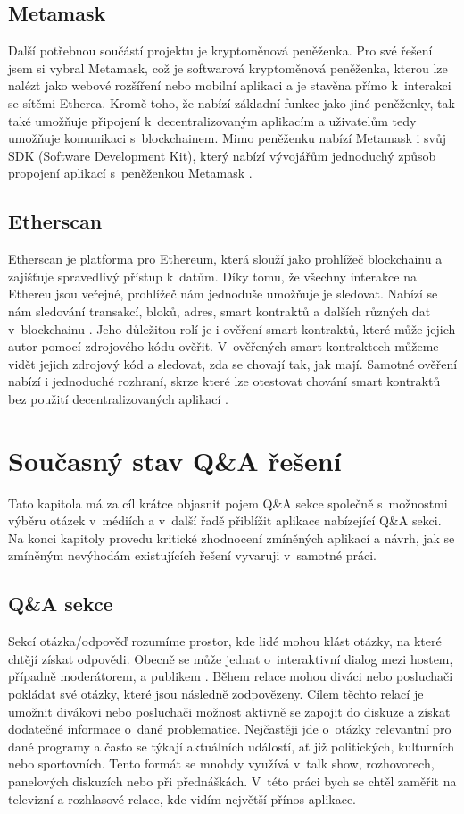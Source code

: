 \section{Metamask}
Další potřebnou součástí projektu je kryptoměnová peněženka. Pro své řešení jsem si vybral Metamask, což je softwarová kryptoměnová peněženka, kterou lze nalézt jako webové rozšíření nebo mobilní aplikaci a je stavěna přímo k~interakci se sítěmi Etherea. Kromě toho, že nabízí základní funkce jako jiné peněženky, tak také umožňuje připojení k~decentralizovaným aplikacím a uživatelům tedy umožňuje komunikaci s~blockchainem. Mimo peněženku nabízí Metamask i svůj SDK (Software Development Kit), který nabízí vývojářům jednoduchý způsob propojení aplikací s~peněženkou Metamask \cite{metamask}.

\section{Etherscan}
Etherscan je platforma pro Ethereum, která slouží jako prohlížeč blockchainu a zajišťuje spravedlivý přístup k~datům. Díky tomu, že všechny interakce na Ethereu jsou veřejné, prohlížeč nám jednoduše umožňuje je sledovat. Nabízí se nám sledování transakcí, bloků, adres, smart kontraktů a dalších různých dat v~blockchainu \cite{binance_etherscan}. Jeho důležitou rolí je i ověření smart kontraktů, které může jejich autor pomocí zdrojového kódu ověřit. V~ověřených smart kontraktech můžeme vidět jejich zdrojový kód a sledovat, zda se chovají tak, jak mají. Samotné ověření nabízí i jednoduché rozhraní, skrze které lze otestovat chování smart kontraktů bez použití decentralizovaných aplikací \cite{etherscan}.

\chapter{Současný stav Q\&A řešení}
\label{chapter:5}
Tato kapitola má za cíl krátce objasnit pojem Q\&A sekce společně s~možnostmi výběru otázek v~médiích a v~další řadě přiblížit aplikace nabízející Q\&A sekci. Na konci kapitoly provedu kritické zhodnocení zmíněných aplikací a návrh, jak se zmíněným nevýhodám existujících řešení vyvaruji v~samotné práci. 
\section{Q\&A sekce}
Sekcí otázka/odpověď rozumíme prostor, kde lidé mohou klást otázky, na které chtějí získat odpovědi. Obecně se může jednat o~interaktivní dialog mezi hostem, případně moderátorem, a publikem \cite{slidoqa}. Během relace mohou diváci nebo posluchači pokládat své otázky, které jsou následně zodpovězeny. Cílem těchto relací je umožnit divákovi nebo posluchači možnost aktivně se zapojit do diskuze a získat dodatečné informace o~dané problematice. Nejčastěji jde o~otázky relevantní pro dané programy a často se týkají aktuálních událostí, ať již politických, kulturních nebo sportovních. Tento formát se mnohdy využívá v~talk show, rozhovorech, panelových diskuzích nebo při přednáškách. V~této práci bych se chtěl zaměřit na televizní a rozhlasové relace, kde vidím největší přínos aplikace. 
